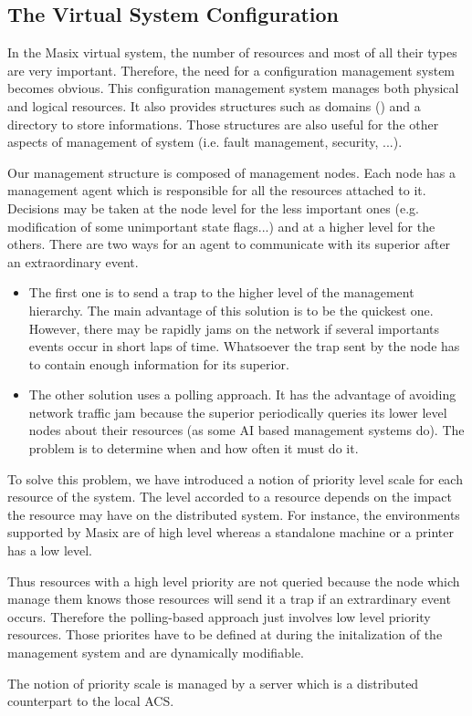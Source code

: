 \subsection{The Virtual System Configuration}
 
   In the Masix virtual system, the number of resources and most of all their types are very important. Therefore, the need for a configuration management system becomes obvious.
   This configuration management system manages both physical and logical resources. It also provides structures such as domains (\cite {langsford92}) and a directory to store informations. Those structures are also useful for the other aspects of management of system (i.e. fault management, security, ...).

   Our management structure is composed of management nodes. Each node has a management agent which is responsible for all the resources attached to it. Decisions may be taken at the node level for the less important ones (e.g. modification of some unimportant state flags...) and at a higher level for the others. There are two ways for an agent to communicate with its superior after an extraordinary event.

\begin{itemize}

	\item The first one is to send a trap to the higher level of the management hierarchy. The main advantage of this solution is to be the quickest one. However, there may be rapidly jams on the network if several importants events occur in short laps of time. Whatsoever the trap sent by the node has to contain enough information for its superior\cite {rose91}.

	\item The other solution uses a polling approach. It has the advantage of avoiding network traffic jam because the superior periodically queries its lower level nodes about their resources (as some AI based management systems do). The problem is to determine when and how often it must do it.

\end{itemize}
 
   To solve this problem, we have introduced a notion of priority level scale for each resource of the system. The level accorded to a resource depends on the impact the resource may have on the distributed system.
   For instance, the environments supported by Masix are of high level whereas a standalone machine or a printer has a low level.

   Thus resources with a high level priority are not queried because the node which manage them knows those resources will send it a trap if an extrardinary event occurs. Therefore the polling-based approach just involves low level priority resources.
   Those priorites have to be defined at during the initalization of the management system and are dynamically modifiable.

   The notion of priority scale is managed by a server which is a distributed
counterpart to the local ACS.
